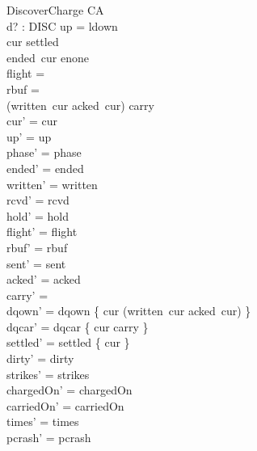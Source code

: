 \documentclass[a4paper,10pt,fleqn]{article}
\begin{document}
\begin{schema}{DiscoverCharge}
  \Delta CA \\
  d? : DISC
\where
  up = ldown \\
  cur \notin settled \\
  ended~cur \neq enone \\
  flight = \emptyset \\
  rbuf = \emptyset \\
  (written~cur \setminus acked~cur) \cup carry \neq \emptyset \\
  cur' = cur \\
  up' = up \\
  phase' = phase \\
  ended' = ended \\
  written' = written \\
  rcvd' = rcvd \\
  hold' = hold \\
  flight' = flight \\
  rbuf' = rbuf \\
  sent' = sent \\
  acked' = acked \\
  carry' = \emptyset \\
  dqown' = dqown \cup \{ cur \mapsto (written~cur \setminus acked~cur) \} \\
  dqcar' = dqcar \cup \{ cur \mapsto carry \} \\
  settled' = settled \cup \{ cur \} \\
  dirty' = dirty \\
  strikes' = strikes \\
  chargedOn' = chargedOn \\
  carriedOn' = carriedOn \\
  times' = times \\
  pcrash' = pcrash
\end{schema}
\end{document}
